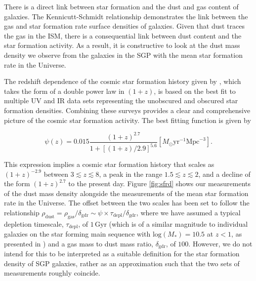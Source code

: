 There is a direct link between star formation and the dust and gas content of galaxies. The Kennicutt-Schmidt relationship demonstrates the link between the gas and star formation rate surface densities of galaxies. Given that dust traces the gas in the ISM, there is a consequential link between dust content and the star formation activity. As a result, it is constructive to look at the dust mass density we observe from the galaxies in the SGP with the mean star formation rate in the Universe.

The redshift dependence of the cosmic star formation history given by \citealt{Madau_2014}, which takes the form of a double power law in $(1 + z)$, is based on the best fit to multiple UV and IR data sets representing the unobscured and obscured star formation densities. Combining these surveys provides a clear and comprehensive picture of the cosmic star formation activity. The best fitting function is given by

\begin{equation}
    \psi(z) = 0.015\frac{(1+z)^{2.7}}{1+[(1+z)/2.9]^{5.6}} [M_{\odot}\textrm{yr}^{-1}\textrm{Mpc}^{-3}].
    \label{eq:madau_sfrd}
\end{equation}

This expression implies a cosmic star formation history that scales as $(1 + z)^{-2.9}$ between $3 \lesssim z \lesssim 8$, a peak in the range $1.5 \lesssim z \lesssim 2$, and a decline of the form $(1 + z)^{2.7}$ to the present day. Figure \ref{fig:sfrd} shows our measurements of the dust mass density alongside the measurements of the mean star formation rate in the Universe. The offset between the two scales has been set to follow the relationship $\rho_{\textrm{dust}} = \rho_{\textrm{gas}}/\delta_{\textrm{gdr}} \sim \psi \times\tau_{\textrm{depl}}/\delta_{\textrm{gdr}}$, where we have assumed a typical depletion timescale, $\tau_{\textrm{depl}}$, of $1\,$Gyr (which is of a similar magnitude to individual galaxies on the star forming main sequence with $\textrm{log}(M_*) = 10.5$ at $z < 1$, as presented in \citealt{Tacconi_2020}) and a gas mass to dust mass ratio, $\delta_{\textrm{gdr}}$, of $100$. However, we do not intend for this to be interpreted as a suitable definition for the star formation density of SGP galaxies, rather as an approximation such that the two sets of measurements roughly coincide. 

